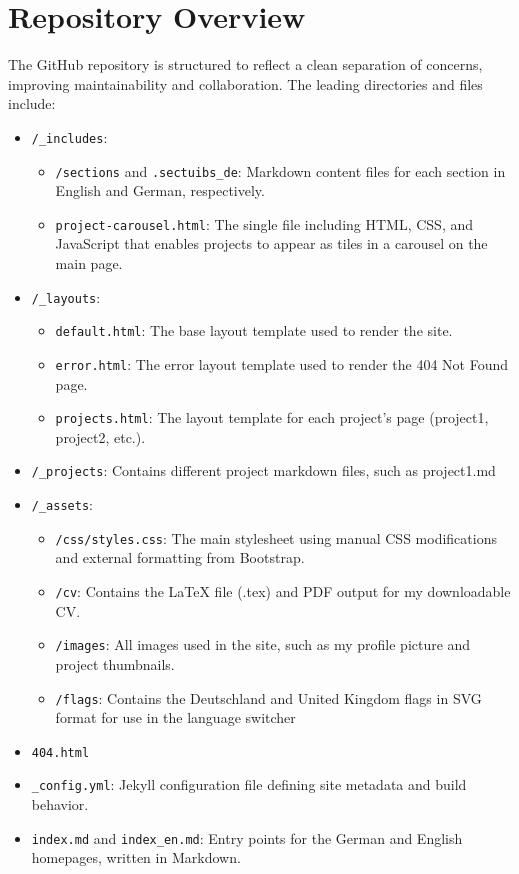 \section{Repository Overview}
The GitHub repository is structured to reflect a clean separation of concerns, improving maintainability and collaboration. The leading directories and files include:
\begin{itemize}
	\item \verb|/_includes|:
	\begin{itemize}
		\item \verb|/sections| and \verb|.sectuibs_de|: Markdown content files for each section in English and German, respectively.
		\item \verb|project-carousel.html|: The single file including HTML, CSS, and JavaScript that enables projects to appear as tiles in a carousel on the main page.
	\end{itemize}
	\item \verb|/_layouts|:
	\begin{itemize}
		\item \verb|default.html|: The base layout template used to render the site.
		\item \verb|error.html|: The error layout template used to render the 404 Not Found page.
		\item \verb|projects.html|: The layout template for each project’s page (project1, project2, etc.).
	\end{itemize}
	\item \verb|/_projects|: Contains different project markdown files, such as project1.md
	\item \verb|/_assets|:
	\begin{itemize}
		\item \verb|/css/styles.css|: The main stylesheet using manual CSS modifications and external formatting from Bootstrap.
		\item \verb|/cv|: Contains the LaTeX file (.tex) and PDF output for my downloadable CV.
		\item \verb|/images|: All images used in the site, such as my profile picture and project thumbnails.
		\item \verb|/flags|: Contains the Deutschland and United Kingdom flags in SVG format for use in the language switcher
	\end{itemize}
	\item \verb|404.html|
	\item \verb|_config.yml|: Jekyll configuration file defining site metadata and build behavior.
	\item \verb|index.md| and \verb|index_en.md|: Entry points for the German and English homepages, written in Markdown.
\end{itemize}
